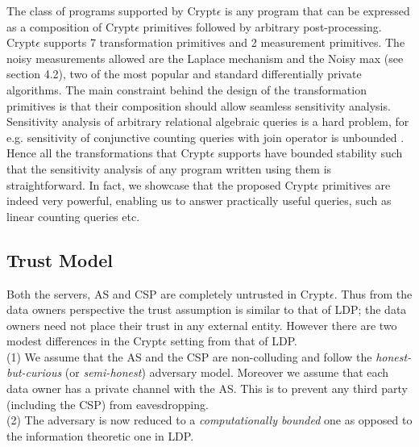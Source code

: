{The class of programs supported by Crypt$\epsilon$ is any program that can be expressed as a composition of  Crypt$\epsilon$ primitives followed by arbitrary post-processing. Crypt$\epsilon$ supports 7 transformation primitives and 2 measurement primitives. The noisy measurements allowed are the Laplace mechanism and the Noisy max (see section 4.2), two of the most popular and standard differentially private algorithms. The main constraint behind the design of the transformation primitives is that their composition should allow seamless sensitivity analysis.  Sensitivity analysis of arbitrary relational algebraic queries is a hard problem, for e.g. sensitivity of conjunctive counting queries with join operator is unbounded \cite{sensitivity}. Hence all the transformations that Crypt$\epsilon$ supports have bounded stability \cite{PINQ} such that the sensitivity analysis of any program written using them is straightforward. In fact, we showcase that the proposed Crypt$\epsilon$ primitives are indeed very powerful, enabling us to answer practically useful queries, such as linear counting queries etc. 
\\ 
}





\subsection{Trust Model}\label{sec:trust}
Both the servers, \textsf{AS} and \textsf{CSP} are completely untrusted in Crypt$\epsilon$. 
Thus from the data owners perspective the trust assumption is similar to that of \textsf{LDP}; the data owners need not place their trust in any external entity. 
However there are two modest differences in the Crypt$\epsilon$ setting from that of \textsf{LDP}.\\
 (1) We assume that the \textsf{AS} and the \textsf{CSP} are non-colluding and follow the \emph{honest-but-curious} (or \textit{semi-honest}) adversary model. %
 Moreover we assume that each data owner has a private channel with the \textsf{AS}. This is to prevent any third party (including the \textsf{CSP}) from eavesdropping. \\
 (2) The adversary is now reduced to a \textit{computationally bounded} one as opposed to the information theoretic one  in \textsf{LDP}.
 

